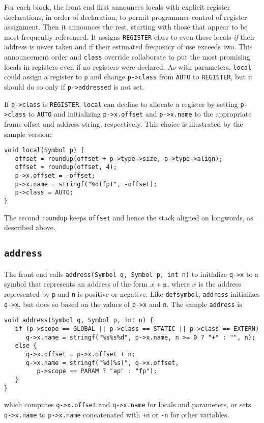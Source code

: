 For each block, the front end first announces locals with explicit
register declarations, in order of declaration, to permit programmer
control of register assignment. Then it announces the rest, starting
with those that appear to be most frequently referenced.  It assigns
\verb|REGISTER| class to even these locals {\em if} their address
is never taken and if their estimated frequency of use exceeds two.
This announcement order and \verb|class| override collaborate to put the most
promising locals in registers even if no registers were declared.  As
with parameters, \verb|local| could assign a register to \verb|p| and
change \verb|p->class| from \verb|AUTO| to \verb|REGISTER|, but it
should do so only if \verb|p->addressed| is not set.

If \verb|p->class| is \verb|REGISTER|, \verb|local|
can decline to allocate a register by setting \verb|p->class| to \verb|AUTO|
and initializing \verb|p->x.offset| and \verb|p->x.name| to the appropriate frame offset
and address string, respectively.
This choice is illustrated by the sample version:
\begin{verbatim}
void local(Symbol p) {
   offset = roundup(offset + p->type->size, p->type->align);
   offset = roundup(offset, 4);
   p->x.offset = -offset;
   p->x.name = stringf("%d(fp)", -offset);
   p->class = AUTO;
}
\end{verbatim}
The second \verb|roundup| keeps \verb|offset| and hence the stack
aligned on longwords, as described above.

\subsection{\tt address}

\label{address}
The front end calls \verb|address(Symbol q, Symbol p, int n)| to
initialize \verb|q->x| to a symbol that represents an address of the form $x+{\tt n}$,
where $x$ is the address represented by \verb|p| and \verb|n| is positive or negative.
Like \verb|defsymbol|, \verb|address| initializes \verb|q->x|, but
does so based on the values of \verb|p->x| and \verb|n|.
The sample \verb|address| is
\begin{verbatim}
void address(Symbol q, Symbol p, int n) {
   if (p->scope == GLOBAL || p->class == STATIC || p->class == EXTERN)
      q->x.name = stringf("%s%s%d", p->x.name, n >= 0 ? "+" : "", n);
   else {
      q->x.offset = p->x.offset + n;
      q->x.name = stringf("%d(%s)", q->x.offset,
         p->scope == PARAM ? "ap" : "fp");
   }
}
\end{verbatim}
which computes \verb|q->x.offset| and \verb|q->x.name| for locals and parameters,
or sets \verb|q->x.name| to \verb|p->x.name| concatenated with \verb|+n| or \verb|-n|
for other variables. 

